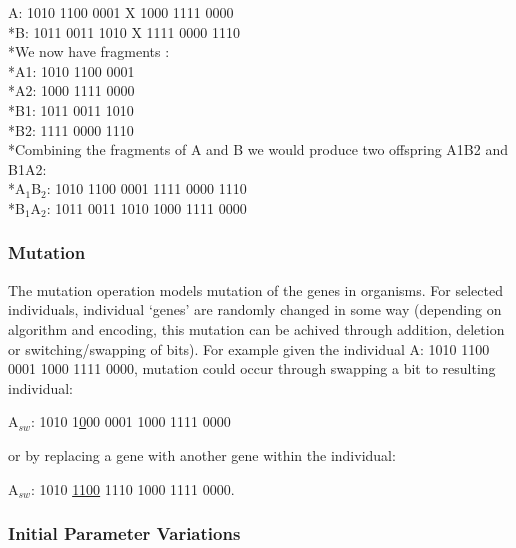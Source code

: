 \begin{center}
A: 1010 1100 0001 X 1000 1111 0000
\\*B: 1011 0011 1010 X 1111 0000 1110
\vspace{2 mm}
\\*We now have fragments : 
\\*A1: 1010 1100 0001 
\\*A2: 1000 1111 0000
\\*B1: 1011 0011 1010 
\\*B2: 1111 0000 1110
\vspace{2 mm}
\\*Combining the fragments of A and B we would produce two offspring A1B2 and B1A2:
\vspace{2 mm}
\\*A\(_{1}\)B\(_{2}\): 1010 1100 0001 1111 0000 1110
\\*B\(_{1}\)A\(_{2}\): 1011 0011 1010 1000 1111 0000
\end{center}

\subsubsection{Mutation}
The mutation operation models mutation of the genes in organisms. For selected individuals, individual `genes' are randomly 
changed in some way (depending on algorithm and encoding, this mutation can be achived through addition, deletion or switching/swapping of bits).
For example given the individual A:  1010 1100 0001 1000 1111 0000, mutation could occur through swapping a bit to resulting 
individual: 
\begin{center} A\(_{sw}\):   1010 1\underline{0}00 0001 1000 1111 0000 \end{center}
or by replacing a gene with another gene within the individual:
\begin{center} A\(_{sw}\):   1010 \underline{1100} 1110 1000 1111 0000.\end{center}
                                                           
\subsubsection{Initial Parameter Variations}

